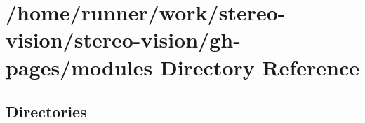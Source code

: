 \section{/home/runner/work/stereo-\/vision/stereo-\/vision/gh-\/pages/modules Directory Reference}
\label{dir_e05d7e2b1ecd646af5bb94391405f3b5}
\subsection*{Directories}
\begin{DoxyCompactItemize}
\end{DoxyCompactItemize}
